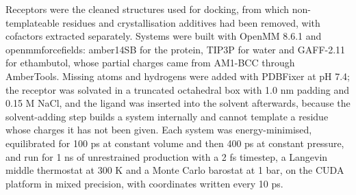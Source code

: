 \documentclass[utf8]{FrontiersinVancouver}
\begin{document}
Receptors were the cleaned structures used for docking, from which non-templateable residues and crystallisation additives had been removed, with cofactors extracted separately. Systems were built with OpenMM 8.6.1 and openmmforcefields: amber14SB for the protein, TIP3P for water and GAFF-2.11 for ethambutol, whose partial charges came from AM1-BCC through AmberTools. Missing atoms and hydrogens were added with PDBFixer at pH 7.4; the receptor was solvated in a truncated octahedral box with 1.0 nm padding and 0.15 M NaCl, and the ligand was inserted into the solvent afterwards, because the solvent-adding step builds a system internally and cannot template a residue whose charges it has not been given. Each system was energy-minimised, equilibrated for 100 ps at constant volume and then 400 ps at constant pressure, and run for 1 ns of unrestrained production with a 2 fs timestep, a Langevin middle thermostat at 300 K and a Monte Carlo barostat at 1 bar, on the CUDA platform in mixed precision, with coordinates written every 10 ps.
\end{document}
